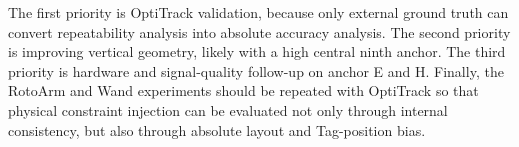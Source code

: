 \documentclass[11pt]{article}
\begin{document}
The first priority is OptiTrack validation, because only external ground truth can convert repeatability analysis into absolute accuracy analysis. The second priority is improving vertical geometry, likely with a high central ninth anchor. The third priority is hardware and signal-quality follow-up on anchor E and H. Finally, the RotoArm and Wand experiments should be repeated with OptiTrack so that physical constraint injection can be evaluated not only through internal consistency, but also through absolute layout and Tag-position bias.
\end{document}
